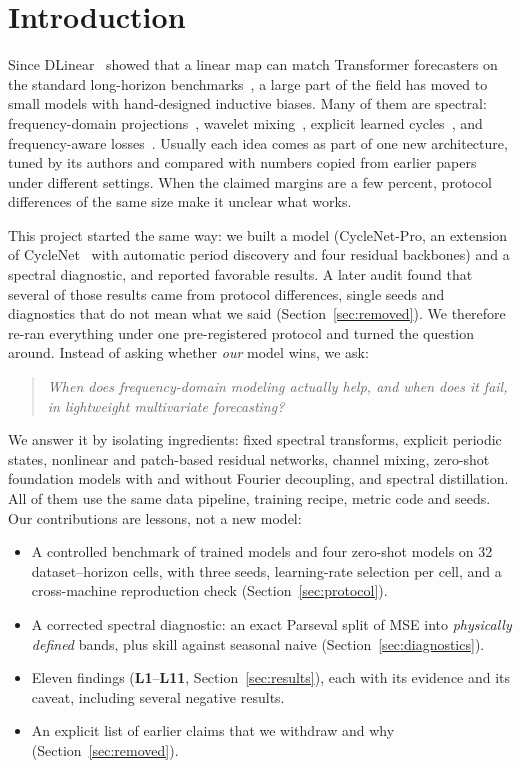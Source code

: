 \documentclass[11pt,a4paper]{article}
\newcommand{\lrn}[1]{\textbf{L#1}}
\begin{document}
\section{Introduction}
\label{sec:intro}
Since DLinear~\cite{zeng2023dlinear} showed that a linear map can match Transformer forecasters on the standard long-horizon benchmarks~\cite{wu2021autoformer,zhou2022fedformer,nie2023patchtst}, a large part of the field has moved to small models with hand-designed inductive biases. Many of them are spectral: frequency-domain projections~\cite{zhou2022fedformer}, wavelet mixing~\cite{wpmixer2024}, explicit learned cycles~\cite{liu2024cyclenet,lin2025tqnet}, and frequency-aware losses~\cite{FreqCycle2026,FreqLens2026}. Usually each idea comes as part of one new architecture, tuned by its authors and compared with numbers copied from earlier papers under different settings. When the claimed margins are a few percent, protocol differences of the same size make it unclear what works.

This project started the same way: we built a model (CycleNet-Pro, an extension of CycleNet~\cite{liu2024cyclenet} with automatic period discovery and four residual backbones) and a spectral diagnostic, and reported favorable results. A later audit found that several of those results came from protocol differences, single seeds and diagnostics that do not mean what we said (Section~\ref{sec:removed}). We therefore re-ran everything under one pre-registered protocol and turned the question around. Instead of asking whether \emph{our} model wins, we ask:

\begin{quote}
\emph{When does frequency-domain modeling actually help, and when does it fail, in lightweight multivariate forecasting?}
\end{quote}

We answer it by isolating ingredients: fixed spectral transforms, explicit periodic states, nonlinear and patch-based residual networks, channel mixing, zero-shot foundation models with and without Fourier decoupling, and spectral distillation. All of them use the same data pipeline, training recipe, metric code and seeds. Our contributions are lessons, not a new model:
\begin{itemize}
    \item A controlled benchmark of \nTrained{} trained models and four zero-shot models on 32 dataset--horizon cells, with three seeds, learning-rate selection per cell, and a cross-machine reproduction check (Section~\ref{sec:protocol}).
    \item A corrected spectral diagnostic: an exact Parseval split of MSE into \emph{physically defined} bands, plus skill against seasonal naive (Section~\ref{sec:diagnostics}).
    \item Eleven findings (\lrn{1}--\lrn{11}, Section~\ref{sec:results}), each with its evidence and its caveat, including several negative results.
    \item An explicit list of earlier claims that we withdraw and why (Section~\ref{sec:removed}).
\end{itemize}
\end{document}
